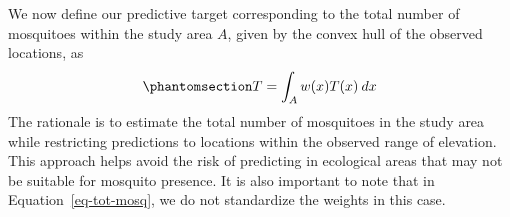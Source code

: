 \documentclass[
  letterpaper,
]{krantz}
\newenvironment{Shaded}{\begin{snugshade}}{\end{snugshade}}
\newcommand{\AttributeTok}[1]{\textcolor[rgb]{0.13,0.29,0.53}{#1}}
\newcommand{\CommentTok}[1]{\textcolor[rgb]{0.56,0.35,0.01}{\textit{#1}}}
\newcommand{\ControlFlowTok}[1]{\textcolor[rgb]{0.13,0.29,0.53}{\textbf{#1}}}
\newcommand{\DecValTok}[1]{\textcolor[rgb]{0.00,0.00,0.81}{#1}}
\newcommand{\FunctionTok}[1]{\textcolor[rgb]{0.13,0.29,0.53}{\textbf{#1}}}
\newcommand{\NormalTok}[1]{#1}
\newcommand{\OtherTok}[1]{\textcolor[rgb]{0.56,0.35,0.01}{#1}}
\newcommand{\SpecialCharTok}[1]{\textcolor[rgb]{0.81,0.36,0.00}{\textbf{#1}}}
\newcommand{\StringTok}[1]{\textcolor[rgb]{0.31,0.60,0.02}{#1}}
\begin{document}
\begin{Shaded}
\end{Shaded}

We now define our predictive target corresponding to the total number of
mosquitoes within the study area \(A\), given by the convex hull of the
observed locations, as
\begin{equation}\phantomsection\label{eq-tot-mosq}{
T = \int_{A} w(x) T(x) \: dx
}\end{equation} The rationale is to estimate the total number of
mosquitoes in the study area while restricting predictions to locations
within the observed range of elevation. This approach helps avoid the
risk of predicting in ecological areas that may not be suitable for
mosquito presence. It is also important to note that in
Equation~\ref{eq-tot-mosq}, we do not standardize the weights in this
case.
\end{document}
